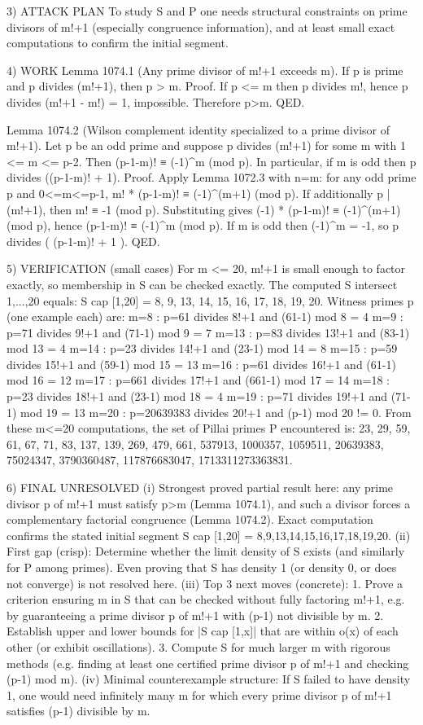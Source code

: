 3) ATTACK PLAN
To study S and P one needs structural constraints on prime divisors of m!+1 (especially congruence information), and at least small exact computations to confirm the initial segment.

4) WORK
Lemma 1074.1 (Any prime divisor of m!+1 exceeds m).
If p is prime and p divides (m!+1), then p > m.
Proof. If p <= m then p divides m!, hence p divides (m!+1 - m!) = 1, impossible. Therefore p>m. QED.

Lemma 1074.2 (Wilson complement identity specialized to a prime divisor of m!+1).
Let p be an odd prime and suppose p divides (m!+1) for some m with 1 <= m <= p-2.
Then (p-1-m)! ≡ (-1)^m (mod p). In particular, if m is odd then p divides ((p-1-m)! + 1).
Proof. Apply Lemma 1072.3 with n=m: for any odd prime p and 0<=m<=p-1,
  m! * (p-1-m)! ≡ (-1)^(m+1) (mod p).
If additionally p | (m!+1), then m! ≡ -1 (mod p). Substituting gives
  (-1) * (p-1-m)! ≡ (-1)^(m+1) (mod p),
hence (p-1-m)! ≡ (-1)^m (mod p). If m is odd then (-1)^m = -1, so p divides ( (p-1-m)! + 1 ). QED.

5) VERIFICATION (small cases)
For m <= 20, m!+1 is small enough to factor exactly, so membership in S can be checked exactly.
The computed S intersect {1,...,20} equals:
  S cap [1,20] = {8, 9, 13, 14, 15, 16, 17, 18, 19, 20}.
Witness primes p (one example each) are:
  m=8  : p=61 divides 8!+1 and (61-1) mod 8 = 4
  m=9  : p=71 divides 9!+1 and (71-1) mod 9 = 7
  m=13 : p=83 divides 13!+1 and (83-1) mod 13 = 4
  m=14 : p=23 divides 14!+1 and (23-1) mod 14 = 8
  m=15 : p=59 divides 15!+1 and (59-1) mod 15 = 13
  m=16 : p=61 divides 16!+1 and (61-1) mod 16 = 12
  m=17 : p=661 divides 17!+1 and (661-1) mod 17 = 14
  m=18 : p=23 divides 18!+1 and (23-1) mod 18 = 4
  m=19 : p=71 divides 19!+1 and (71-1) mod 19 = 13
  m=20 : p=20639383 divides 20!+1 and (p-1) mod 20 != 0.
From these m<=20 computations, the set of Pillai primes P encountered is:
  {23, 29, 59, 61, 67, 71, 83, 137, 139, 269, 479, 661, 537913, 1000357, 1059511, 20639383, 75024347, 3790360487, 117876683047, 1713311273363831}.

6) FINAL
UNRESOLVED
(i) Strongest proved partial result here: any prime divisor p of m!+1 must satisfy p>m (Lemma 1074.1), and such a divisor forces a complementary factorial congruence (Lemma 1074.2). Exact computation confirms the stated initial segment S cap [1,20] = {8,9,13,14,15,16,17,18,19,20}.
(ii) First gap (crisp): Determine whether the limit density of S exists (and similarly for P among primes). Even proving that S has density 1 (or density 0, or does not converge) is not resolved here.
(iii) Top 3 next moves (concrete):
  1. Prove a criterion ensuring m in S that can be checked without fully factoring m!+1, e.g. by guaranteeing a prime divisor p of m!+1 with (p-1) not divisible by m.
  2. Establish upper and lower bounds for |S cap [1,x]| that are within o(x) of each other (or exhibit oscillations).
  3. Compute S for much larger m with rigorous methods (e.g. finding at least one certified prime divisor p of m!+1 and checking (p-1) mod m).
(iv) Minimal counterexample structure: If S failed to have density 1, one would need infinitely many m for which every prime divisor p of m!+1 satisfies (p-1) divisible by m.




